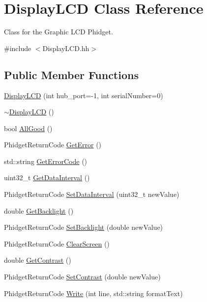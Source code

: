 \hypertarget{classDisplayLCD}{}\section{Display\+L\+CD Class Reference}
\label{classDisplayLCD}


Class for the Graphic L\+CD Phidget.  




{\ttfamily \#include $<$Display\+L\+C\+D.\+hh$>$}

\subsection*{Public Member Functions}
\begin{DoxyCompactItemize}
\item 
\hyperlink{classDisplayLCD_a04f74ffd3ac0f9499ae3d8941ed27f9c}{Display\+L\+CD} (int hub\+\_\+port=-\/1, int serial\+Number=0)
\item 
\hyperlink{classDisplayLCD_ac6ed1397321b6faae3bfb2b24bed8035}{$\sim$\+Display\+L\+CD} ()
\item 
bool \hyperlink{classDisplayLCD_ada423180074b506b76c1bce2ee0762bd}{All\+Good} ()
\item 
Phidget\+Return\+Code \hyperlink{classDisplayLCD_aa1c6e2464e7a21f1d2298efb50f4f5cf}{Get\+Error} ()
\item 
std\+::string \hyperlink{classDisplayLCD_af29a65af420a16e9995e7e2187e4af99}{Get\+Error\+Code} ()
\item 
uint32\+\_\+t \hyperlink{classDisplayLCD_a4d5cb25aaf17312c7639422f44df7071}{Get\+Data\+Interval} ()
\item 
Phidget\+Return\+Code \hyperlink{classDisplayLCD_a07fef3e48aaccd4c66931ee886945e5d}{Set\+Data\+Interval} (uint32\+\_\+t new\+Value)
\item 
double \hyperlink{classDisplayLCD_af9aa55093dd8b4a11489b2e490aed8cc}{Get\+Backlight} ()
\item 
Phidget\+Return\+Code \hyperlink{classDisplayLCD_acd9635087f3d813a39aa0b266f05203a}{Set\+Backlight} (double new\+Value)
\item 
Phidget\+Return\+Code \hyperlink{classDisplayLCD_ac3ea2662388a42733fbf525f3d933be7}{Clear\+Screen} ()
\item 
double \hyperlink{classDisplayLCD_ab7ec5dfb25093bf45480807989db4049}{Get\+Contrast} ()
\item 
Phidget\+Return\+Code \hyperlink{classDisplayLCD_a4e97d5bbd320dd69724809d3f446b578}{Set\+Contrast} (double new\+Value)
\item 
Phidget\+Return\+Code \hyperlink{classDisplayLCD_ab8c5e288a7ce5c0dde1806f821036bac}{Write} (int line, std\+::string format\+Text)
\end{DoxyCompactItemize}


